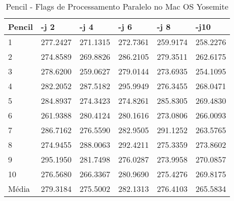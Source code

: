 \begin{table}[!ht]
\centering
\caption{Pencil - Flags de Processamento Paralelo no Mac OS Yosemite}
\label{tab:flag_processamento_paralelo:mac:pencil}
\begin{tabular}{llllll}
\textbf{Pencil} & \textbf{-j 2} & \textbf{-j 4} & \textbf{-j 6} & \textbf{-j 8} & \textbf{-j10}  \\ \toprule
1               & 277.2427  &   271.1315 &    272.7361  &   259.9174  &   258.2276          \\ 
2               & 274.8589  &   269.8826 &    286.2105  &   279.3511  &   262.6175          \\ 
3               & 278.6200  &   259.0627 &    279.0144  &   273.6935  &   254.1095          \\ 
4               & 282.2052  &   287.5182 &    295.9949  &   276.3455  &   268.0471          \\ 
5               & 284.8937  &   274.3423 &    274.8261  &   285.8305  &   269.4830          \\ 
6               & 261.9388  &   280.4124 &    280.1616  &   273.0806  &   266.0093          \\ 
7               & 286.7162  &   276.5590 &    282.9505  &   291.1252  &   263.5765          \\ 
8               & 274.9455  &   288.0063 &    292.4211  &   275.3359  &   273.8602          \\ 
9               & 295.1950  &   281.7498 &    276.0287  &   273.9958  &   270.0857          \\ 
10              & 276.5680  &   266.3367 &    280.9690  &   275.4276  &   269.8175          \\ \bottomrule
Média           & 279.3184  &   275.5002 &    282.1313  &   276.4103  &   265.5834          \\ 
\end{tabular}
\end{table}

